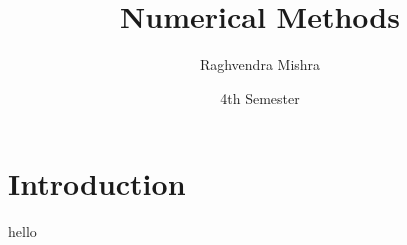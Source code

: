 \documentclass{article}
\title{Numerical Methods}
\author{Raghvendra Mishra}
\date{4th Semester}
\begin{document}
\maketitle

\section{Introduction}
hello
\end{document}
